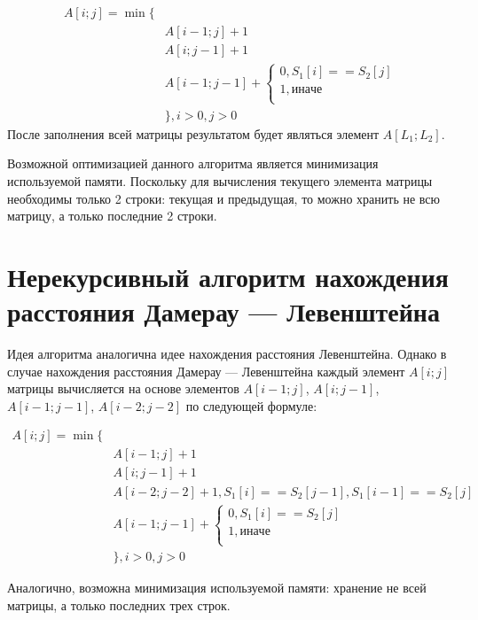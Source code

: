 \begin{equation}
	\begin{aligned}
		A[i;j] = \min\lbrace &\\
		& A[i-1;j] + 1\\
		& A[i;j-1] + 1\\
		& A[i-1;j-1] + \begin{cases}
			0, S_{1}[i] == S_{2}[j]\\
			1, иначе\\
		\end{cases}\\
		&\rbrace, i > 0, j > 0
	\end{aligned}
\end{equation}
После заполнения всей матрицы результатом будет являться элемент $A[L_{1};L_{2}]$.

Возможной оптимизацией данного алгоритма является минимизация используемой памяти. Поскольку для вычисления текущего элемента матрицы необходимы только 2 строки: текущая и предыдущая, то можно хранить не всю матрицу, а только последние 2 строки.

\section{Нерекурсивный алгоритм нахождения расстояния Дамерау --- Левенштейна}
Идея алгоритма аналогична идее нахождения расстояния Левенштейна. Однако в случае нахождения расстояния Дамерау --- Левенштейна каждый элемент $A[i;j]$ матрицы вычисляется на основе элементов $A[i-1;j]$, $A[i;j-1]$, $A[i-1;j-1]$, $A[i-2; j-2]$ по следующей формуле:

\begin{equation}
	\begin{aligned}
		A[i;j] = \min\lbrace &\\
		& A[i-1;j] + 1\\
		& A[i;j-1] + 1\\
		& A[i-2;j-2] + 1, S_{1}[i] == S_{2}[j-1], S_{1}[i-1] == S_{2}[j]\\
		& A[i-1;j-1] + \begin{cases}
			0, S_{1}[i] == S_{2}[j]\\
			1, иначе\\
		\end{cases}\\
		&\rbrace, i > 0, j > 0
	\end{aligned}
\end{equation}

Аналогично, возможна минимизация используемой памяти: хранение не всей матрицы, а только последних трех строк.

